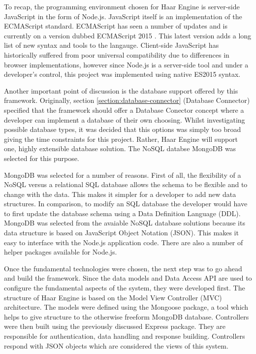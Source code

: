     To recap, the programming environment chosen for Haar Engine is server-side JavaScript in the form of Node.js. JavaScript itself is an implementation of the ECMAScript standard. ECMAScript has seen a number of updates and is currently on a version dubbed ECMAScript 2015 \citep{es2015}. This latest version adds a long list of new syntax and tools to the langauge. Client-side JavaScript has historically suffered from poor universal compatibility due to differences in browser implementations, however since Node.js is a server-side tool and under a developer's control, this project was implemented using native ES2015 syntax.

    Another important point of discussion is the database support offered by this framework. Originally, section \ref{section:database-connector} (Database Connector) specified that the framework should offer a Database Conector concept where a developer can implement a database of their own choosing. Whilst investigating possible database types, it was decided that this options was simply too broad giving the time constraints for this project. Rather, Haar Engine will support one, highly extensible database solution. The NoSQL databse MongoDB was selected for this purpose.

    MongoDB was selected for a number of reasons. First of all, the flexibility of a NoSQL versus a relational SQL database allows the schema to be flexible and to change with the data. This makes it simpler for a developer to add new data structures. In comparison, to modify an SQL database the developer would have to first update the database schema using a Data Definition Language (DDL). MongoDB was selected from the avaiable NoSQL database solutions because its data structure is based on JavaScript Object Notation (JSON). This makes it easy to interface with the Node.js application code. There are also a number of helper packages available for Node.js.

    Once the fundamental technologies were chosen, the next step was to go ahead and build the framework. Since the data models and Data Access API are used to configure the fundamental aspects of the system, they were developed first. The structure of Haar Engine is based on the Model View Controller (MVC) architecture. The models were defined using the Mongoose package, a tool which helps to give structure to the otherwise freeform MongoDB database. Controllers were then built using the previously discussed Express package. They are responsible for authentication, data handling and response building. Controllers respond with JSON objects which are considered the views of this system.

